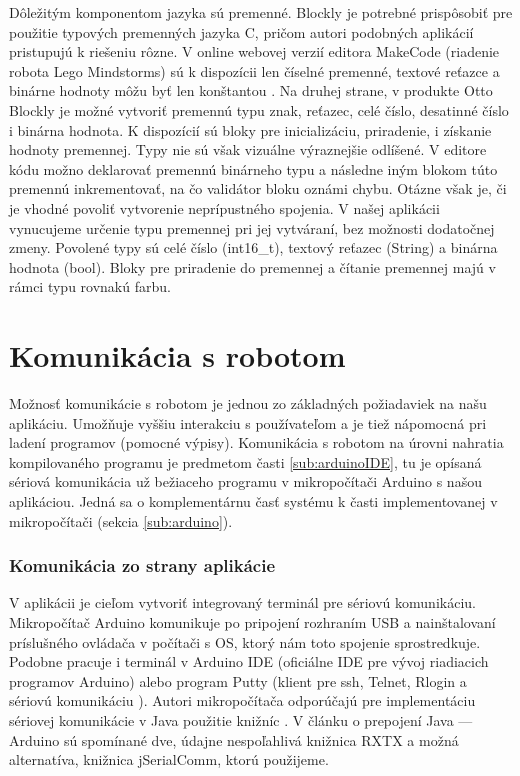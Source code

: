 Dôležitým komponentom jazyka sú premenné. Blockly je potrebné prispôsobiť pre použitie typových premenných jazyka C, pričom autori podobných aplikácií pristupujú k riešeniu rôzne. V online webovej verzií editora MakeCode (riadenie robota Lego Mindstorms) sú k dispozícii len číselné premenné, textové reťazce a binárne hodnoty môžu byť len konštantou \cite{makeCodeWebEditor}. Na druhej strane, v produkte Otto Blockly je možné vytvoriť premennú typu znak, reťazec, celé číslo, desatinné číslo i binárna hodnota. K dispozícií sú bloky pre inicializáciu, priradenie, i získanie hodnoty premennej. Typy nie sú však vizuálne výraznejšie odlíšené. V editore kódu možno deklarovať premennú binárneho typu a následne iným blokom túto premennú inkrementovať, na čo validátor bloku oznámi chybu. Otázne však je, či je vhodné povoliť vytvorenie neprípustného spojenia. V našej aplikácii vynucujeme určenie typu premennej pri jej vytváraní, bez možnosti dodatočnej zmeny. Povolené typy sú celé číslo (int16\_t), textový reťazec (String) a binárna hodnota (bool). Bloky pre priradenie do premennej a čítanie premennej majú v rámci typu rovnakú farbu.



\section{Komunikácia s robotom}
Možnosť komunikácie s robotom je jednou zo základných požiadaviek na našu aplikáciu. Umožňuje vyššiu interakciu s používateľom a je tiež nápomocná pri ladení programov (pomocné výpisy). Komunikácia s robotom na úrovni nahratia kompilovaného programu je predmetom časti \ref{sub:arduinoIDE}, tu je opísaná sériová komunikácia už bežiaceho programu v mikropočítači Arduino s našou aplikáciou. Jedná sa o komplementárnu časť systému k časti implementovanej v mikropočítači (sekcia \ref{sub:arduino}).

\subsubsection{Komunikácia zo strany aplikácie}
V aplikácii je cieľom vytvoriť integrovaný terminál pre sériovú komunikáciu. Mikropočítač Arduino komunikuje po pripojení rozhraním USB a nainštalovaní príslušného ovládača v počítači s OS, ktorý nám toto spojenie sprostredkuje. Podobne pracuje i terminál v Arduino IDE (oficiálne IDE pre vývoj riadiacich programov Arduino) alebo program Putty (klient pre ssh, Telnet, Rlogin a sériovú komunikáciu \cite{putty}). Autori mikropočítača odporúčajú pre implementáciu sériovej komunikácie v Java použitie knižníc \cite{arduinoAndJava}. V článku o prepojení Java --- Arduino sú spomínané dve, údajne nespoľahlivá knižnica RXTX a možná alternatíva, knižnica jSerialComm, ktorú použijeme. 

